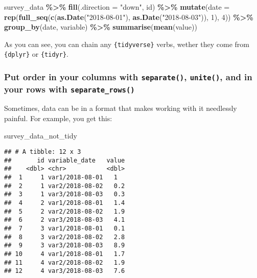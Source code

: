 \documentclass[
]{article}
\newenvironment{Shaded}{\begin{snugshade}}{\end{snugshade}}
\newcommand{\DataTypeTok}[1]{\textcolor[rgb]{0.13,0.29,0.53}{#1}}
\newcommand{\DecValTok}[1]{\textcolor[rgb]{0.00,0.00,0.81}{#1}}
\newcommand{\KeywordTok}[1]{\textcolor[rgb]{0.13,0.29,0.53}{\textbf{#1}}}
\newcommand{\NormalTok}[1]{#1}
\newcommand{\OperatorTok}[1]{\textcolor[rgb]{0.81,0.36,0.00}{\textbf{#1}}}
\newcommand{\StringTok}[1]{\textcolor[rgb]{0.31,0.60,0.02}{#1}}
\begin{document}
\begin{Shaded}
\begin{Highlighting}[]
\NormalTok{survey\_data }\OperatorTok{\%\textgreater{}\%}
\StringTok{    }\KeywordTok{fill}\NormalTok{(}\DataTypeTok{.direction =} \StringTok{"down"}\NormalTok{, id) }\OperatorTok{\%\textgreater{}\%}
\StringTok{    }\KeywordTok{mutate}\NormalTok{(}\DataTypeTok{date =} \KeywordTok{rep}\NormalTok{(}\KeywordTok{full\_seq}\NormalTok{(}\KeywordTok{c}\NormalTok{(}\KeywordTok{as.Date}\NormalTok{(}\StringTok{"2018{-}08{-}01"}\NormalTok{), }\KeywordTok{as.Date}\NormalTok{(}\StringTok{"2018{-}08{-}03"}\NormalTok{)), }\DecValTok{1}\NormalTok{), }\DecValTok{4}\NormalTok{)) }\OperatorTok{\%\textgreater{}\%}
\StringTok{    }\KeywordTok{group\_by}\NormalTok{(date, variable) }\OperatorTok{\%\textgreater{}\%}
\StringTok{    }\KeywordTok{summarise}\NormalTok{(}\KeywordTok{mean}\NormalTok{(value))}
\end{Highlighting}
\end{Shaded}

As you can see, you can chain any \texttt{\{tidyverse\}} verbs, wether they come from \texttt{\{dplyr\}} or \texttt{\{tidyr\}}.

\hypertarget{put-order-in-your-columns-with-separate-unite-and-in-your-rows-with-separate_rows}{%
\subsubsection{\texorpdfstring{Put order in your columns with \texttt{separate()}, \texttt{unite()}, and in your rows with \texttt{separate\_rows()}}{Put order in your columns with separate(), unite(), and in your rows with separate\_rows()}}\label{put-order-in-your-columns-with-separate-unite-and-in-your-rows-with-separate_rows}}

Sometimes, data can be in a format that makes working with it needlessly painful. For example, you
get this:

\begin{Shaded}
\begin{Highlighting}[]
\NormalTok{survey\_data\_not\_tidy}
\end{Highlighting}
\end{Shaded}

\begin{verbatim}
## # A tibble: 12 x 3
##       id variable_date   value
##    <dbl> <chr>           <dbl>
##  1     1 var1/2018-08-01   1  
##  2     1 var2/2018-08-02   0.2
##  3     1 var3/2018-08-03   0.3
##  4     2 var1/2018-08-01   1.4
##  5     2 var2/2018-08-02   1.9
##  6     2 var3/2018-08-03   4.1
##  7     3 var1/2018-08-01   0.1
##  8     3 var2/2018-08-02   2.8
##  9     3 var3/2018-08-03   8.9
## 10     4 var1/2018-08-01   1.7
## 11     4 var2/2018-08-02   1.9
## 12     4 var3/2018-08-03   7.6
\end{verbatim}
\end{document}
